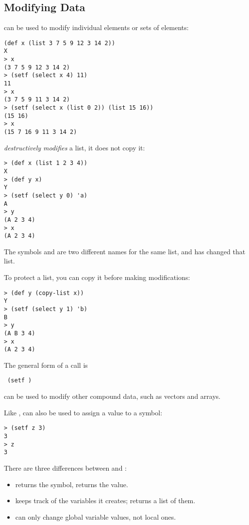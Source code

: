 \begin{slide}{}
\subsection{Modifying Data}
 can be used to modify individual elements or sets of elements:
{\Large
\begin{verbatim}
(def x (list 3 7 5 9 12 3 14 2))
X
> x
(3 7 5 9 12 3 14 2)
> (setf (select x 4) 11)
11
> x
(3 7 5 9 11 3 14 2)
> (setf (select x (list 0 2)) (list 15 16))
(15 16)
> x
(15 7 16 9 11 3 14 2)
\end{verbatim}}
\end{slide}

\begin{slide}{}
 {\em destructively modifies}\/ a list, it does not copy it:
\begin{verbatim}
> (def x (list 1 2 3 4))
X
> (def y x)
Y
> (setf (select y 0) 'a)
A
> y
(A 2 3 4)
> x
(A 2 3 4)
\end{verbatim}
The symbols  and  are two different names for the
same list, and  has changed that list.
\end{slide}

\begin{slide}{}
To protect a list, you can copy it before making modifications:
\begin{verbatim}
> (def y (copy-list x))
Y
> (setf (select y 1) 'b)
B
> y
(A B 3 4)
> x
(A 2 3 4)
\end{verbatim}
\end{slide}

\begin{slide}{}
The general form of a  call is
\begin{flushleft}\tt
(setf  )
\end{flushleft}
 can be used to modify other compound data, such as
vectors and arrays.

Like ,  can also be used to assign a value to a
symbol:
\begin{verbatim}
> (setf z 3)
3
> z
3
\end{verbatim}
There are three differences between  and :
\begin{itemize}
\item
{} returns the symbol,  returns the value.
\item
{} keeps track of the variables it creates;
 returns a list of them.
\item
{} can only change global variable values, not local ones.
\end{itemize}
\end{slide}

